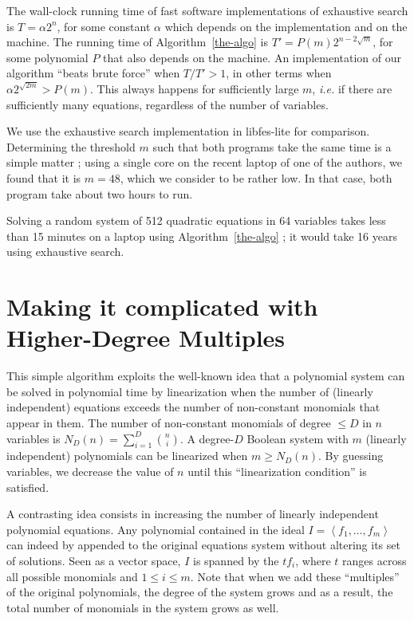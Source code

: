 \documentclass[a4paper,UKenglish,cleveref, autoref]{lipics-v2019}
\begin{document}
The wall-clock running time of fast software implementations of exhaustive
search is $T = \alpha 2^n$, for some constant $\alpha$ which depends on the
implementation and on the machine. The running time of Algorithm~\ref{the-algo}
is $T' = P(m) 2^{n - 2\sqrt{m}}$, for some polynomial $P$ that also depends on
the machine. An implementation of our algorithm ``beats brute force'' when
$T/T' > 1$, in other terms when $\alpha 2^{\sqrt{2m}} > P(m)$. This always
happens for sufficiently large $m$, \textit{i.e.} if there are sufficiently many
equations, regardless of the number of variables.

We use the exhaustive search implementation in \textsf{libfes-lite} for
comparison. Determining the threshold $m$ such that both programs take the same
time is a simple matter ; using a single core on the recent laptop of one of the
authors, we found that it is $m=48$, which we consider to be rather low. In that
case, both program take about two hours to run.

Solving a random system of 512 quadratic equations in 64 variables takes less
than 15 minutes on a laptop using Algorithm~\ref{the-algo} ; it would take 16
years using exhaustive search.


\section{Making it complicated with Higher-Degree Multiples}
\label{sec:extensions}

This simple algorithm exploits the well-known idea that a polynomial system can
be solved in polynomial time by linearization when the number of (linearly
independent) equations exceeds the number of non-constant monomials that appear
in them. The number of non-constant monomials of degree $\leq D$ in $n$
variables is $N_D(n) = \sum_{i=1}^D \binom{n}{i}$. A degree-$D$ Boolean system
with $m$ (linearly independent) polynomials can be linearized when
$m \geq N_D(n)$. By guessing variables, we decrease the value of $n$ until this
``linearization condition'' is satisfied.

A contrasting idea consists in increasing the number of linearly independent
polynomial equations.  Any polynomial contained in the ideal
$I = \left\langle f_1, \dots, f_m\right\rangle$ can indeed by appended to the
original equations system without altering its set of solutions. Seen as a
vector space, $I$ is spanned by the $t f_i$, where $t$ ranges across all
possible monomials and $1 \leq i \leq m$. Note that when we add these
``multiples'' of the original polynomials, the degree of the system grows and as
a result, the total number of monomials in the system grows as well.
\end{document}
